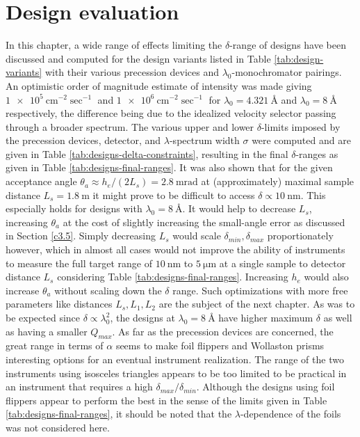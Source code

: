 \section{Design evaluation}
In this chapter, a wide range of effects limiting the $\delta$-range of designs have been discussed and computed for the design variants listed in Table \ref{tab:design-variants} with their various precession devices and $\lambda_0$-monochromator pairings. An optimistic order of magnitude estimate of intensity was made giving $\SI{1e5}{\centi\meter^{-2}\sec^{-1}}$ and $\SI{1e6}{\centi\meter^{-2}\sec^{-1}}$ for $\lambda_0 = \SI{4.321}{\angstrom}$ and $\lambda_0 = \SI{8}{\angstrom}$ respectively, the difference being due to the idealized velocity selector passing through a broader spectrum. The various upper and lower $\delta$-limits imposed by the precession devices, detector, and $\lambda$-spectrum width $\sigma$ were computed and are given in Table \ref{tab:designs-delta-constraints}, resulting in the final $\delta$-ranges as given in Table \ref{tab:designs-final-ranges}. It was also shown that for the given acceptance angle $\theta_a \approx h_e / (2L_s) = \SI{2.8}{\milli\radian}$ at (approximately) maximal sample distance $L_s = \SI{1.8}{\meter}$ it might prove to be difficult to access $\delta\propto \SI{10}{\nano\meter}$. This especially holds for designs with $\lambda_0 = \SI{8}{\angstrom}$. It would help to decrease $L_s$, increasing $\theta_a$ at the cost of slightly increasing the small-angle error as discussed in Section \ref{c3.5}. Simply decreasing $L_s$ would scale $\delta_{min}, \delta_{max}$ proportionately however, which in almost all cases would not improve the ability of instruments to measure the full target range of $\SI{10}{\nano\meter}$ to $\SI{5}{\micro\meter}$ at a single sample to detector distance $L_s$ considering Table \ref{tab:designs-final-ranges}. Increasing $h_e$ would also increase $\theta_a$ without scaling down the $\delta$ range. Such optimizations with more free parameters like distances $L_s, L_1, L_2$ are the subject of the next chapter. As was to be expected since $\delta \propto \lambda_0^2$, the designs at $\lambda_0 = \SI{8}{\angstrom}$ have higher maximum $\delta$ as well as having a smaller $Q_{max}$. As far as the precession devices are concerned, the great range in terms of $\alpha$ seems to make foil flippers and Wollaston prisms interesting options for an eventual instrument realization. The range of the two instruments using isosceles triangles appears to be too limited to be practical in an instrument that requires a high $\delta_{max}/\delta_{min}$. Although the designs using foil flippers appear to perform the best in the sense of the limits given in Table \ref{tab:designs-final-ranges}, it should be noted that the $\lambda$-dependence \cite{kraan2003} of the foils was not considered here.